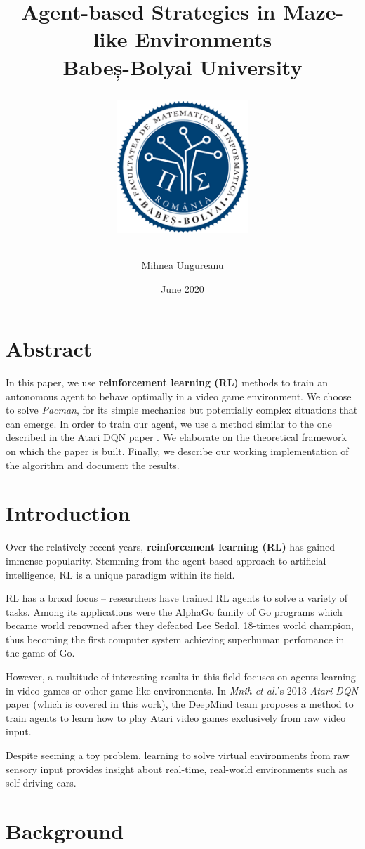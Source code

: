 \documentclass[12pt,twoside]{report}
\title{
    {Agent-based Strategies in Maze-like Environments}\\
    {\large Babeș-Bolyai University}\\
    {
        \begin{figure}[h]
            \includegraphics[width=5cm]{logo_cs.png}
            \centering
        \end{figure}
    }
}
\author{Mihnea Ungureanu}
\date{June 2020}
\begin{document}
\maketitle

\chapter*{Abstract}
In this paper, we use \textbf{reinforcement learning (RL)} methods to train an autonomous agent to behave optimally in a video game environment.
We choose to solve \emph{Pacman}, for its simple mechanics but potentially complex situations that can emerge.
In order to train our agent, we use a method similar to the one described in the Atari DQN paper \cite{atari-dqn}.
We elaborate on the theoretical framework on which the paper is built.
Finally, we describe our working implementation of the algorithm and document the results.

\chapter*{Introduction}
Over the relatively recent years, \textbf{reinforcement learning (RL)} has gained immense popularity.
Stemming from the agent-based approach to artificial intelligence, RL is a unique paradigm within its field.

RL has a broad focus -- researchers have trained RL agents to solve a variety of tasks.
Among its applications were the AlphaGo family of Go programs \cite{ago, alpha-zero} which became world renowned after they defeated Lee Sedol, 18-times world champion, thus becoming the first computer system achieving superhuman perfomance in the game of Go.

However, a multitude of interesting results in this field focuses on agents learning in video games or other game-like environments.
In \emph{Mnih et al.}'s 2013 \emph{Atari DQN} paper \cite{atari-dqn} (which is covered in this work), the DeepMind team proposes a method to train agents to learn how to play Atari video games exclusively from raw video input.

Despite seeming a toy problem, learning to solve virtual environments from raw sensory input provides insight about real-time, real-world environments such as self-driving cars.

\tableofcontents

\chapter{Background}

\end{document}
